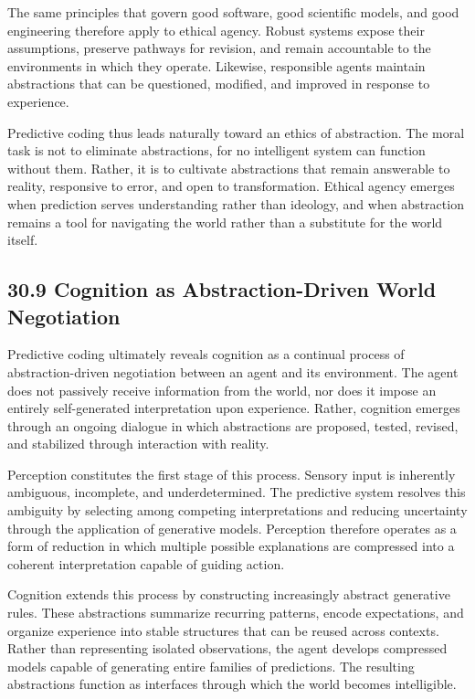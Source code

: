 \documentclass[12pt,letterpaper]{article}
\theoremstyle{remark}
\begin{document}
The same principles that govern good software, good scientific models, and good engineering therefore apply to ethical agency. Robust systems expose their assumptions, preserve pathways for revision, and remain accountable to the environments in which they operate. Likewise, responsible agents maintain abstractions that can be questioned, modified, and improved in response to experience.

Predictive coding thus leads naturally toward an ethics of abstraction. The moral task is not to eliminate abstractions, for no intelligent system can function without them. Rather, it is to cultivate abstractions that remain answerable to reality, responsive to error, and open to transformation. Ethical agency emerges when prediction serves understanding rather than ideology, and when abstraction remains a tool for navigating the world rather than a substitute for the world itself.

\subsection{30.9 Cognition as Abstraction-Driven World Negotiation}

Predictive coding ultimately reveals cognition as a continual process of abstraction-driven negotiation between an agent and its environment. The agent does not passively receive information from the world, nor does it impose an entirely self-generated interpretation upon experience. Rather, cognition emerges through an ongoing dialogue in which abstractions are proposed, tested, revised, and stabilized through interaction with reality.

Perception constitutes the first stage of this process. Sensory input is inherently ambiguous, incomplete, and underdetermined. The predictive system resolves this ambiguity by selecting among competing interpretations and reducing uncertainty through the application of generative models. Perception therefore operates as a form of reduction in which multiple possible explanations are compressed into a coherent interpretation capable of guiding action.

Cognition extends this process by constructing increasingly abstract generative rules. These abstractions summarize recurring patterns, encode expectations, and organize experience into stable structures that can be reused across contexts. Rather than representing isolated observations, the agent develops compressed models capable of generating entire families of predictions. The resulting abstractions function as interfaces through which the world becomes intelligible.
\end{document}
